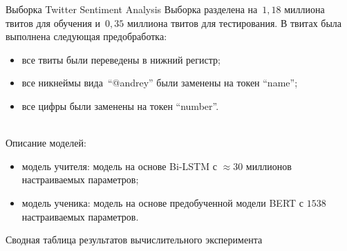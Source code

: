 \documentclass[9pt,pdf,hyperref={unicode}]{beamer}
\begin{document}
\begin{frame}{Выборка Twitter Sentiment Analysis}
\justifying
Выборка разделена на~$1{,}18$ миллиона твитов для обучения и~$0{,}35$ миллиона твитов для тестирования. В твитах была выполнена следующая предобработка:
\begin{itemize}
	\item все твиты были переведены в нижний регистр;
	\item все никнеймы вида~``@andrey'' были заменены на токен ``name'';
	\item все цифры были заменены на токен ``number''.
\end{itemize}

~\\
Описание моделей:
\begin{itemize}
	\item модель учителя: модель на основе Bi-LSTM с $\approx 30$ миллионов настраиваемых параметров;
	\item модель ученика: модель на основе предобученной модели BERT с $1538$ настраиваемых параметров.
\end{itemize}

\end{frame}


\begin{frame}{Сводная таблица результатов вычислительного эксперимента}
\justifying

\begin{table}[]
\begin{center}
\end{center}
\end{table}

\end{frame}
\end{document}
